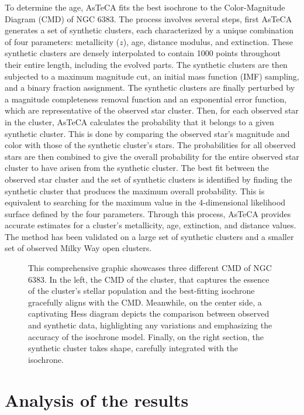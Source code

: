 \documentclass[fleqn,usenatbib,usedcolumn,useAMS]{mnras}
\begin{document}
To determine the age, AsTeCA fits the best isochrone to the Color-Magnitude Diagram (CMD) of NGC 6383. The process involves several steps, first AsTeCA generates a set of synthetic clusters, each characterized by a unique combination of four parameters: metallicity ($z$), age, distance modulus, and extinction. These synthetic clusters are densely interpolated to contain 1000 points throughout their entire length, including the evolved parts. The synthetic clusters are then subjected to a maximum magnitude cut, an initial mass function (IMF) sampling, and a binary fraction assignment. The synthetic clusters are finally perturbed by a magnitude completeness removal function and an exponential error function, which are representative of the observed star cluster. Then, for each observed star in the cluster, AsTeCA calculates the probability that it belongs to a given synthetic cluster. This is done by comparing the observed star's magnitude and color with those of the synthetic cluster's stars. The probabilities for all observed stars are then combined to give the overall probability for the entire observed star cluster to have arisen from the synthetic cluster. The best fit between the observed star cluster and the set of synthetic clusters is identified by finding the synthetic cluster that produces the maximum overall probability. This is equivalent to searching for the maximum value in the 4-dimensional likelihood surface defined by the four parameters. Through this process, AsTeCA provides accurate estimates for a cluster's metallicity, age, extinction, and distance values. The method has been validated on a large set of synthetic clusters and a smaller set of observed Milky Way open clusters.

\begin{figure}
	\centering
    \caption{This comprehensive graphic showcases three different CMD of NGC 6383. In the left, the CMD of the cluster, that captures the essence of the cluster's stellar population and the best-fitting isochrone gracefully aligns with the CMD. Meanwhile, on the center side, a captivating Hess diagram depicts the comparison between observed and synthetic data, highlighting any variations and emphasizing the accuracy of the isochrone model. Finally, on the right section, the synthetic cluster takes shape, carefully integrated with the isochrone.}
    \label{fig:cmd}
\end{figure}


\section{Analysis of the results}\label{results}
\end{document}
